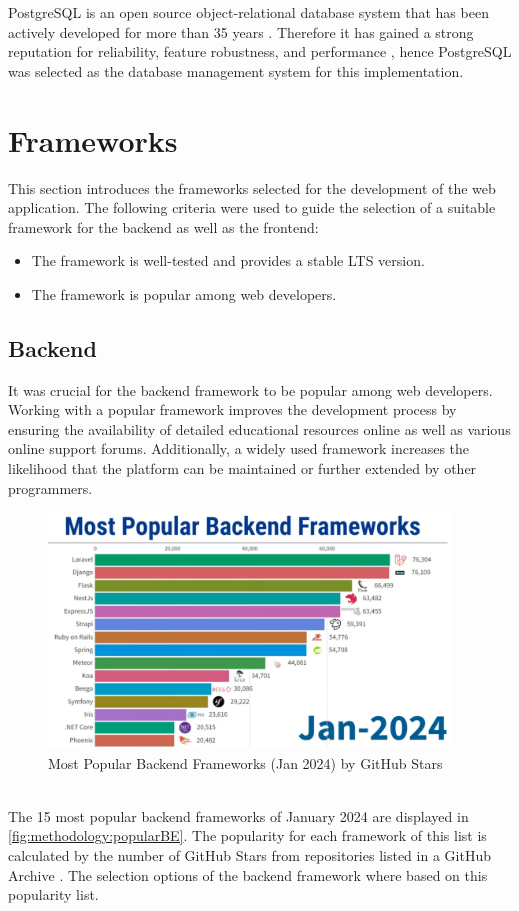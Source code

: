 PostgreSQL is an open source object-relational database system that has been actively developed for more than 35 years \cite{methodology:db}. Therefore it has gained a strong reputation for reliability, feature robustness, and performance \cite{methodology:db}, hence PostgreSQL was selected as the database management system for this implementation.

\section{Frameworks}
\label{sec:methodology:frameworks}
This section introduces the frameworks selected for the development of the web application. The following criteria were used to guide the selection of a suitable framework for the backend as well as the frontend:
\begin{itemize}
    \item The framework is well-tested and provides a stable \ac{LTS} version.
    \item The framework is popular among web developers.
\end{itemize}

\subsection{Backend}
\label{subsec:methodology:frameworks:backend}
It was crucial for the backend framework to be popular among web developers. Working with a popular framework improves the development process by ensuring the availability of detailed educational resources online as well as various online support forums. Additionally, a widely used framework increases the likelihood that the platform can be maintained or further extended by other programmers.
\begin{figure}[htbp]
 \centering
 \includegraphics[width=0.95\textwidth]{gfx/figures/Popular_BE.png}
 \caption{Most Popular Backend Frameworks (Jan 2024) by GitHub Stars \cite{backend:popularity}}
 \label{fig:methodology:popularBE}
\end{figure}
~\\
The 15 most popular backend frameworks of January 2024 are displayed in \autoref{fig:methodology:popularBE}. The popularity for each framework of this list is calculated by the number of GitHub Stars from repositories listed in a GitHub Archive \cite{backend:popularity}. The selection options of the backend framework where based on this popularity list.

